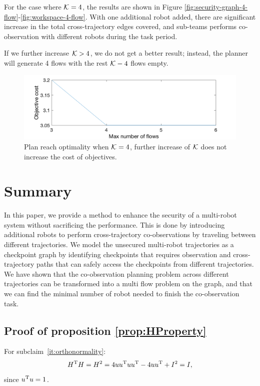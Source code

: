 \documentclass[journal]{IEEEtran}  %
\begin{document}
For the case where $\mathcal{K}=4$, the results are shown in Figure \ref{fig:security-graph-4-flow}-\ref{fig:workspace-4-flow}. With one additional robot added, there are significant increase in the total cross-trajectory edges covered, and sub-teams performs co-observation with different robots during the task period.

If we further increase $\mathcal{K}>4$, we do not get a better result; instead, the planner will generate 4 flows with the rest $\mathcal{K}-4$ flows empty.

\begin{figure}[htbp]
\begin{center}
\includegraphics[width=0.6\linewidth]{nflow_vs_cost}
\caption{Plan reach optimality when $\mathcal{K}=4$, further increase of $\mathcal{K}$ does not increase the cost of objectives.}
\label{fig:flow-n-vs-cost}
\end{center}
\end{figure}

\section{Summary}
In this paper, we provide a method to enhance the security of a multi-robot system without sacrificing the performance. This is done by introducing additional robots to perform cross-trajectory co-observations by traveling between different trajectories. We model the unsecured multi-robot trajectories as a checkpoint graph by identifying checkpoints that requires observation and cross-trajectory paths that can safely access the checkpoints from different trajectories. We have shown that the co-observation planning problem across different trajectories can be transformed into a multi flow problem on the graph, and that we can find the minimal number of robot needed to finish the co-observation task.

\appendix


\subsection{Proof of proposition \ref{prop:HProperty}} \label{proof:HProperty}
    For subclaim~\ref{it:orthonormality}:
    \begin{equation}
      H^\mathrm{T} H=H^2=4uu^\mathrm{T} u u^\mathrm{T} - 4uu^\mathrm{T} +I^2=I,
    \end{equation}
    since $u^\mathrm{T} u=1$.
\end{document}
